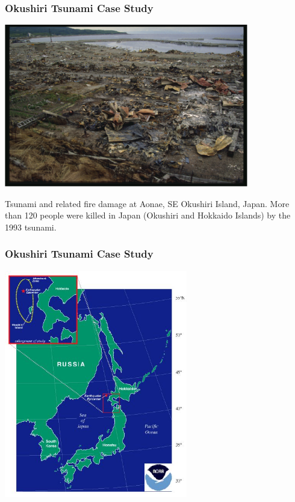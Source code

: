\documentclass[11pt,ucs]{beamer}
\begin{document}
\begin{frame}\frametitle{Okushiri Tsunami Case Study}


\begin{center}
\includegraphics[width=0.8\textwidth]{tsunami-aonae}
\end{center}

{\small Tsunami and related fire damage at Aonae, SE Okushiri Island, Japan.
More than 120 people were killed in Japan (Okushiri and Hokkaido
Islands) by the 1993 tsunami.}

\vfill



\end{frame}



\begin{frame}\frametitle{Okushiri Tsunami Case Study}


\begin{center}
\includegraphics[width=0.6\textwidth]{okushiri-location.jpg}

\end{center}

\end{frame}
\end{document}
